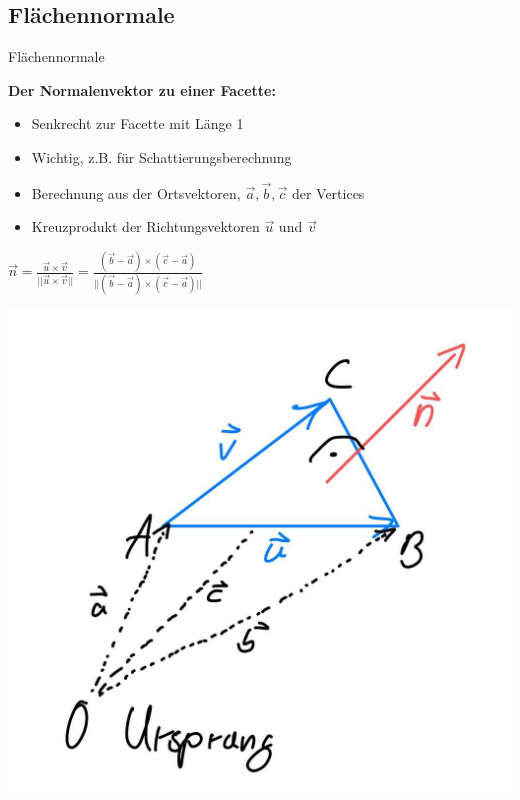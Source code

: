 \documentclass[10pt,aspectratio=169]{beamer}
\begin{document}
  \subsection{Flächennormale}
  \begin{frame}{Flächennormale}
    \begin{minipage}{8cm}
      \normalsize
      \textbf{Der Normalenvektor zu einer Facette:}
      \begin{itemize}
        \item Senkrecht zur Facette mit Länge 1
        \item Wichtig, z.B. für Schattierungsberechnung
        \item Berechnung aus der Ortsvektoren, $\vec{a}, \vec{b}, \vec{c}$ der Vertices
        \item Kreuzprodukt der Richtungsvektoren $\vec{u}$ und $\vec{v}$
      \end{itemize}
      
      \vspace{0.2cm}
      \hspace{0.3cm}
      \large $\vec{n} = \frac{\vec{u} \times \vec{v}}{||\vec{u} \times \vec{v}||} = \frac{(\vec{b} - \vec{a}) \times (\vec{c} - \vec{a})}{||(\vec{b} - \vec{a}) \times (\vec{c} - \vec{a})||}$  
    
      
    \end{minipage}
    \begin{minipage}{3cm}
      \includegraphics[scale=0.125]{sketch_n_vec}  
    \end{minipage}
  \end{frame}
\end{document}
